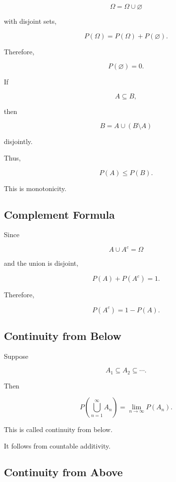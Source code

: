 \[
\Omega
=
\Omega\cup\varnothing
\]

with disjoint sets,

\[
P(\Omega)
=
P(\Omega)+P(\varnothing).
\]

Therefore,

\[
\boxed{
P(\varnothing)=0.
}
\]

If

\[
A\subseteq B,
\]

then

\[
B
=
A
\cup
(B\setminus A)
\]

disjointly.

Thus,

\[
\boxed{
P(A)\leq P(B).
}
\]

This is monotonicity.

\subsection{Complement Formula}
\label{subsec:measure-complement-formula}

Since

\[
A\cup A^c=\Omega
\]

and the union is disjoint,

\[
P(A)+P(A^c)=1.
\]

Therefore,

\[
\boxed{
P(A^c)=1-P(A).
}
\]

\subsection{Continuity from Below}
\label{subsec:continuity-from-below-probability}

Suppose

\[
A_1\subseteq A_2\subseteq\cdots.
\]

Then

\[
\boxed{
P
\left(
\bigcup_{n=1}^{\infty}A_n
\right)
=
\lim_{n\to\infty}P(A_n).
}
\]

This is called continuity from below.

It follows from countable additivity.

\subsection{Continuity from Above}
\label{subsec:continuity-from-above-probability}

